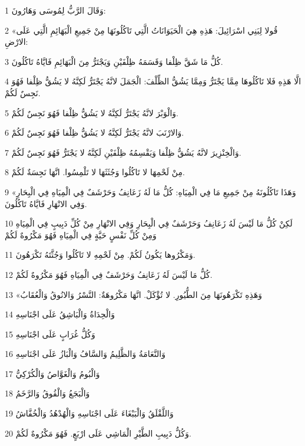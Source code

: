 \par 1 وَقَالَ الرَّبُّ لِمُوسَى وَهَارُونَ:
\par 2 «قُولا لِبَنِي اسْرَائِيلَ: هَذِهِ هِيَ الْحَيَوَانَاتُ الَّتِي تَاكُلُونَهَا مِنْ جَمِيعِ الْبَهَائِمِ الَّتِي عَلَى الارْضِ:
\par 3 كُلُّ مَا شَقَّ ظِلْفا وَقَسَمَهُ ظِلْفَيْنِ وَيَجْتَرُّ مِنَ الْبَهَائِمِ فَايَّاهُ تَاكُلُونَ.
\par 4 الَّا هَذِهِ فَلا تَاكُلُوهَا مِمَّا يَجْتَرُّ وَمِمَّا يَشُقُّ الظِّلْفَ: الْجَمَلَ لانَّهُ يَجْتَرُّ لَكِنَّهُ لا يَشُقُّ ظِلْفا فَهُوَ نَجِسٌ لَكُمْ.
\par 5 وَالْوَبْرَ لانَّهُ يَجْتَرُّ لَكِنَّهُ لا يَشُقُّ ظِلْفا فَهُوَ نَجِسٌ لَكُمْ.
\par 6 وَالارْنَبَ لانَّهُ يَجْتَرُّ لَكِنَّهُ لا يَشُقُّ ظِلْفا فَهُوَ نَجِسٌ لَكُمْ.
\par 7 وَالْخِنْزِيرَ لانَّهُ يَشُقُّ ظِلْفا وَيَقْسِمُهُ ظِلْفَيْنِ لَكِنَّهُ لا يَجْتَرُّ فَهُوَ نَجِسٌ لَكُمْ.
\par 8 مِنْ لَحْمِهَا لا تَاكُلُوا وَجُثَثَهَا لا تَلْمِسُوا. انَّهَا نَجِسَةٌ لَكُمْ.
\par 9 «وَهَذَا تَاكُلُونَهُ مِنْ جَمِيعِ مَا فِي الْمِيَاهِ: كُلُّ مَا لَهُ زَعَانِفُ وَحَرْشَفٌ فِي الْمِيَاهِ فِي الْبِحَارِ وَفِي الانْهَارِ فَايَّاهُ تَاكُلُونَ.
\par 10 لَكِنْ كُلُّ مَا لَيْسَ لَهُ زَعَانِفُ وَحَرْشَفٌ فِي الْبِحَارِ وَفِي الانْهَارِ مِنْ كُلِّ دَبِيبٍ فِي الْمِيَاهِ وَمِنْ كُلِّ نَفْسٍ حَيَّةٍ فِي الْمِيَاهِ فَهُوَ مَكْرُوهٌ لَكُمْ
\par 11 وَمَكْرُوها يَكُونُ لَكُمْ. مِنْ لَحْمِهِ لا تَاكُلُوا وَجُثَّتَهُ تَكْرَهُونَ.
\par 12 كُلُّ مَا لَيْسَ لَهُ زَعَانِفُ وَحَرْشَفٌ فِي الْمِيَاهِ فَهُوَ مَكْرُوهٌ لَكُمْ.
\par 13 «وَهَذِهِ تَكْرَهُونَهَا مِنَ الطُّيُورِ. لا تُؤْكَلْ. انَّهَا مَكْرُوهَةٌ: النَّسْرُ وَالانُوقُ وَالْعُقَابُ
\par 14 وَالْحِدَاةُ وَالْبَاشِقُ عَلَى اجْنَاسِهِ
\par 15 وَكُلُّ غُرَابٍ عَلَى اجْنَاسِهِ
\par 16 وَالنَّعَامَةُ وَالظَّلِيمُ وَالسَّافُ وَالْبَازُ عَلَى اجْنَاسِهِ
\par 17 وَالْبُومُ وَالْغَوَّاصُ وَالْكُرْكِيُّ
\par 18 وَالْبَجَعُ وَالْقُوقُ وَالرَّخَمُ
\par 19 وَاللَّقْلَقُ وَالْبَبْغَاءَ عَلَى اجْنَاسِهِ وَالْهُدْهُدُ وَالْخُفَّاشُ
\par 20 وَكُلُّ دَبِيبِ الطَّيْرِ الْمَاشِي عَلَى ارْبَعٍ. فَهُوَ مَكْرُوهٌ لَكُمْ.
